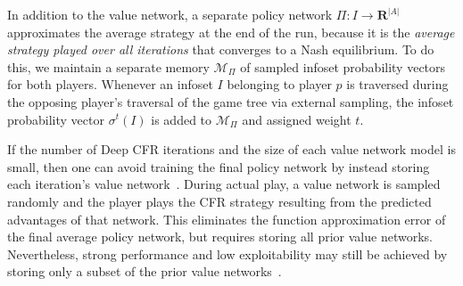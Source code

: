 \documentclass{article}
\newtheorem{theorem}{Theorem}
\newcommand{\noam}[1]{\textbf{\textcolor{cyan}{#1}}}
\begin{document}
In addition to the value network, a separate policy network $\Pi: I \to \mathbf{R}^{|A|}$ approximates the average strategy at the end of the run, because it is the \emph{average strategy played over all iterations} that converges to a Nash equilibrium. To do this, we maintain a separate memory $\mathcal{M}_{\Pi}$ of sampled infoset probability vectors for both players. Whenever an infoset $I$ belonging to player $p$ is traversed during the opposing player's traversal of the game tree via external sampling, the infoset probability vector $\sigma^t(I)$ is added to $\mathcal{M}_{\Pi}$ and assigned weight $t$.

If the number of Deep CFR iterations and the size of each value network model is small, then one can avoid training the final policy network by instead storing each iteration's value network~\cite{Steinberger19:Single}. During actual play, a value network is sampled randomly and the player plays the CFR strategy resulting from the predicted advantages of that network. This eliminates the function approximation error of the final average policy network, but requires storing all prior value networks. Nevertheless, strong performance and low exploitability may still be achieved by storing only a subset of the prior value networks~\cite{Jackson16:Compact}.




\end{document}
